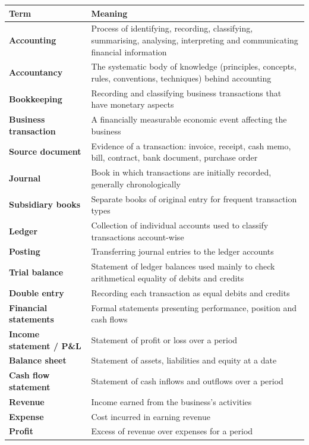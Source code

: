\documentclass[11pt,a4paper]{article}
\begin{document}
\begin{center}
\small
\begin{tabularx}{\textwidth}{@{}l Y@{}}
\toprule
{}\textbf{Term} & \textbf{Meaning}\\
\midrule
\textbf{Accounting} & Process of identifying, recording, classifying, summarising, analysing, interpreting and communicating financial information\\
\textbf{Accountancy} & The systematic body of knowledge (principles, concepts, rules, conventions, techniques) behind accounting\\
\textbf{Bookkeeping} & Recording and classifying business transactions that have monetary aspects\\
\textbf{Business transaction} & A financially measurable economic event affecting the business\\
\textbf{Source document} & Evidence of a transaction: invoice, receipt, cash memo, bill, contract, bank document, purchase order\\
\textbf{Journal} & Book in which transactions are initially recorded, generally chronologically\\
\textbf{Subsidiary books} & Separate books of original entry for frequent transaction types\\
\textbf{Ledger} & Collection of individual accounts used to classify transactions account-wise\\
\textbf{Posting} & Transferring journal entries to the ledger accounts\\
\textbf{Trial balance} & Statement of ledger balances used mainly to check arithmetical equality of debits and credits\\
\textbf{Double entry} & Recording each transaction as equal debits and credits\\
\textbf{Financial statements} & Formal statements presenting performance, position and cash flows\\
\textbf{Income statement / P\&L} & Statement of profit or loss over a period\\
\textbf{Balance sheet} & Statement of assets, liabilities and equity at a date\\
\textbf{Cash flow statement} & Statement of cash inflows and outflows over a period\\
\textbf{Revenue} & Income earned from the business's activities\\
\textbf{Expense} & Cost incurred in earning revenue\\
\textbf{Profit} & Excess of revenue over expenses for a period\\

\end{tabularx}
\end{center}
\end{document}
